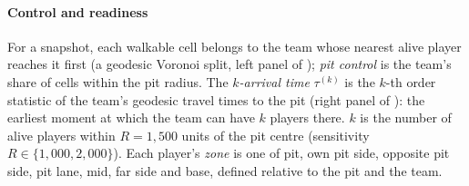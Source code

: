 \paragraph*{Control and readiness}
For a snapshot, each walkable cell belongs to the team whose nearest alive player reaches it first (a geodesic Voronoi split, left panel of ); \emph{pit control} is the team's share of cells within the pit radius.
The \emph{$k$-arrival time} $\tau^{(k)}$ is the $k$-th order statistic of the team's geodesic travel times to the pit (right panel of ): the earliest moment at which the team can have $k$ players there.
$k$ is the number of alive players within $R=1{,}500$ units of the pit centre (sensitivity $R\in\{1{,}000,2{,}000\}$).
Each player's \emph{zone} is one of pit, own pit side, opposite pit side, pit lane, mid, far side and base, defined relative to the pit and the team.

